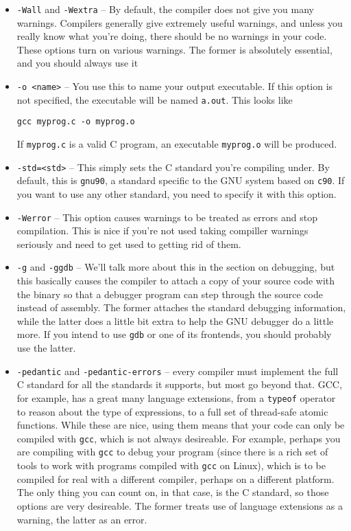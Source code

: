 \documentclass[ebook,11pt,oneside,openany]{memoir}
\newcommand{\cf}[1]{\texttt{#1}}
\begin{document}
\begin{itemize}
\item \cf{-Wall} and \cf{-Wextra} -- By default, the compiler does not give you many warnings. Compilers generally give extremely useful warnings, and unless you really know what you're doing, there should be no warnings in your code. These options turn on various warnings. The former is absolutely essential, and you should always use it

\item \cf{-o <name>} -- You use this to name your output executable. If this option is not specified, the executable will be named \cf{a.out}. This looks like 

\begin{verbatim}
gcc myprog.c -o myprog.o
\end{verbatim}

If \cf{myprog.c} is a valid C program, an executable \cf{myprog.o} will be produced.

\item \cf{-std=<std>} -- This simply sets the C standard you're compiling under. By default, this is \cf{gnu90}, a standard specific to the GNU system based on \cf{c90}. If you want to use any other standard, you need to specify it with this option.

\item \cf{-Werror} -- This option causes warnings to be treated as errors and stop compilation. This is nice if you're not used taking compiller warnings seriously and need to get used to getting rid of them.

\item \cf{-g} and \cf{-ggdb} -- We'll talk more about this in the section on debugging, but this basically causes the compiler to attach a copy of your source code with the binary so that a debugger program can step through the source code instead of assembly. The former attaches the standard debugging information, while the latter does a little bit extra to help the GNU debugger do a little more. If you intend to use \cf{gdb} or one of its frontends, you should probably use the latter.

\item \cf{-pedantic} and \cf{-pedantic-errors} -- every compiler must implement the full C standard for all the standards it supports, but most go beyond that. GCC, for example, has a great many language extensions, from a \cf{typeof} operator to reason about the type of expressions, to a full set of thread-safe atomic functions. While these are nice, using them means that your code can only be compiled with \cf{gcc}, which is not always desireable. For example, perhaps you are compiling with \cf{gcc} to debug your program (since there is a rich set of tools to work with programs compiled with \cf{gcc} on Linux), which is to be compiled for real with a different compiler, perhaps on a different platform. The only thing you can count on, in that case, is the C standard, so those options are very desireable. The former treats use of language extensions as a warning, the latter as an error.


\end{itemize}
\end{document}
